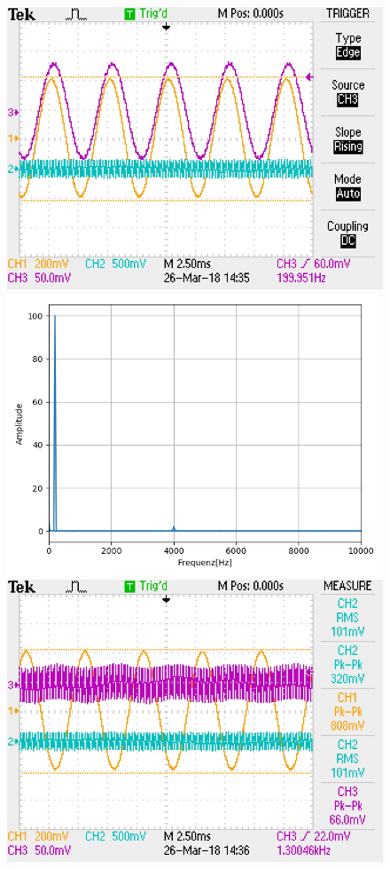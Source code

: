 \documentclass[12pt,a4paper]{article}
\begin{document}
\begin{figure}
\includegraphics[scale=0.9]{Bilder/Vorversuch3/F0001TEK.JPG}
\includegraphics[scale=0.5]{Bilder/Vorversuch3/Vor3_1.png}
\includegraphics[scale=0.9]{Bilder/Vorversuch3/F0002TEK.JPG}

\end{figure}
\end{document}
